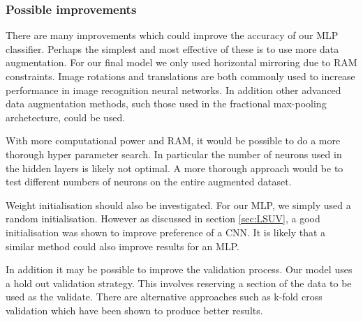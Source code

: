 \subsubsection{Possible improvements}

There are many improvements which could improve the accuracy of our MLP classifier. Perhaps the simplest and most effective of these is to use more data augmentation. For our final model we only used horizontal mirroring due to RAM constraints. Image rotations and translations are both commonly used to increase performance in image recognition neural networks. In addition other advanced data augmentation methods, such those used in the fractional max-pooling archetecture\cite{graham2014fractional}, could be used.

With more computational power and RAM, it would be possible to do a more thorough hyper parameter search. In particular the number of neurons used in the hidden layers is likely not optimal. A more thorough approach would be to test different numbers of neurons on the entire augmented dataset.

Weight initialisation should also be investigated. For our MLP, we simply used a random initialisation. However as discussed in section \ref{sec:LSUV}, a good initialisation was shown to improve preference of a CNN. It is likely that a similar method could also improve results for an MLP.

In addition it may be possible to improve the validation process. Our model uses a hold out validation strategy. This involves reserving a section of the data to be used as the validate. There are alternative approaches such as k-fold cross validation which have been shown to produce better results\cite{blum1999beating}.

\FloatBarrier
